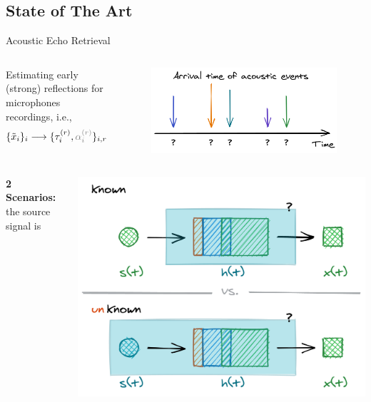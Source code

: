 \subsection*{State of The Art}

\begin{frame}[t]{Acoustic Echo Retrieval \hfill\faBook}
    \begin{columns}[T,onlytextwidth]
            Estimating early (strong) reflections for microphones recordings, i.e.,
            \begin{equation*}
                \{\contMic_i\}_i \longrightarrow \{ \tauir, \textcolor{gray}{\ampir} \}_{i,r}
            \end{equation*}
            \begin{figure}
                \centering
                \includegraphics[width=\textwidth]{./figures/arrivals.png}
            \end{figure}
    \end{columns}

    \vfill
    \begin{columns}[T,onlytextwidth]
        \textbf{2 Scenarios:} the source signal is

        \begin{center}
            \includegraphics[width=.9\textwidth]{./figures/active-passive.png}
        \end{center}


\end{columns}
\end{frame}
